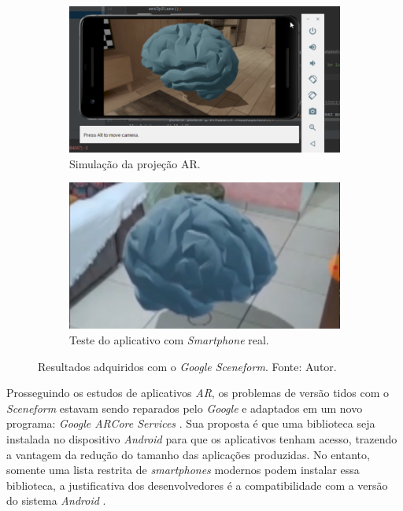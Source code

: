 \begin{figure}[ht]
\centering
    \begin{subfigure}{.45\textwidth}
        \centering
        \includegraphics[width=.95\textwidth]{figuras/sceneform.png}
        \caption{Simulação da projeção AR.}
        \label{fig:sceneform-sim}
    \end{subfigure}
    \begin{subfigure}{.45\textwidth}
        \centering
        \includegraphics[width=.95\textwidth]{figuras/sceneformAR.png}
        \caption{Teste do aplicativo com \textit{Smartphone} real.}
        \label{fig:sceneform-real}
    \end{subfigure}
    \caption{Resultados adquiridos com o \textit{Google Sceneform}. Fonte: Autor.}
    \label{fig:sceneform-tests}
\end{figure}

Prosseguindo os estudos de aplicativos \textit{AR}, os problemas de versão tidos com o \textit{Sceneform} estavam sendo reparados pelo \textit{Google} e adaptados em um novo programa: \textit{Google ARCore Services} \cite{arcore-googleplay}. Sua proposta é que uma biblioteca seja instalada no dispositivo \textit{Android} para que os aplicativos tenham acesso, trazendo a vantagem da redução do tamanho das aplicações produzidas. No entanto, somente uma lista restrita de \textit{smartphones} modernos podem instalar essa biblioteca, a justificativa dos desenvolvedores é a compatibilidade com a versão do sistema \textit{Android} \cite{arcore-list}.

